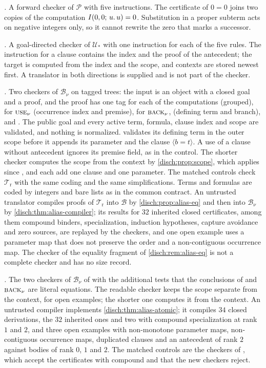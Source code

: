 \emph{.} A forward checker of $\mathcal P$
with five instructions. The certificate of $0=0$ joins two copies of the
computation $I(0,0;\,u.\,u)=0$. Substitution in a proper subterm acts on
negative integers only, so it cannot rewrite the zero that marks a
successor.

\emph{.} A goal-directed checker of
$\mathcal U_*$ with one instruction for each of the five rules. The
instruction for a clause contains the index and the proof of the
antecedent; the target is computed from the index and the scope, and
contexts are stored newest first. A translator in both directions is
supplied and is not part of the checker.

\emph{.} Two checkers of $\mathcal B_{\nu}$
on tagged trees: the input is an object with a closed goal and a proof, and
the proof has one tag for each of the computations (grouped), for
$\rulename{Use}_{\nu}$ (occurrence index and premise), for
$\rulename{Back}_{\nu}$,  (defining term and branch),
 and . The public goal and every active term, formula, clause index and
scope are validated, and nothing is normalized.  validates
its defining term in the outer scope before it appends its parameter and
the clause $\langle b=t\rangle$. A use of a clause without antecedent
ignores its premise field, as in the control. The shorter checker computes
the scope from the context by \cref{disch:prop:scope}, which applies since
,  and  each add one clause
and one parameter. The matched controls check $\mathcal T_{\mathrm r}$ with
the same coding and the same simplifications. Terms and formulas are coded by integers and bare
lists as in the common contract. An untrusted translator
compiles proofs of $\mathcal T_{\mathrm r}$ into $\mathcal B$ by
\cref{disch:prop:alias-eq} and then into $\mathcal B_{\nu}$ by
\cref{disch:thm:alias-compiler}; its results for $32$ inherited closed
certificates, among them compound binders, specialization, induction
hypotheses, capture avoidance and zero sources, are replayed by the
checkers, and one open example uses a parameter map that does not preserve
the order and a non-contiguous occurrence map. The checker of the equality
fragment of \cref{disch:rem:alias-eq} is not a complete checker and has no
size record.

\emph{.} The two checkers of $\mathcal B_{\nu}$ of
 with the additional tests that the conclusions of
 and $\rulename{Back}_{\nu}$ are literal equations. The
readable checker keeps the scope separate from the context, for open
examples; the shorter one computes it from the context. An untrusted
compiler implements \cref{disch:thm:alias-atomic}; it compiles $34$ closed
derivations, the $32$ inherited ones and two with compound specialization
at rank $1$ and $2$, and three open examples with non-monotone parameter
maps, non-contiguous occurrence maps, duplicated clauses and an antecedent
of rank $2$ against bodies of rank $0$, $1$ and $2$. The matched controls
are the checkers of , which accept the certificates with
compound  and  that the new checkers
reject.

